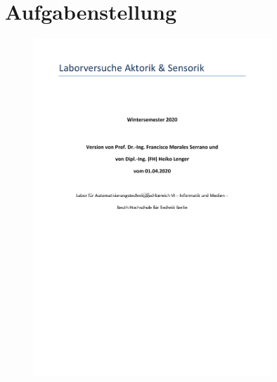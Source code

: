 \section*{Aufgabenstellung}

\begin{figure}[htp]
 \centering
 \includegraphics[page=3, width=0.8\textwidth]{Aufgabenstellung.pdf}
 \label{fig:Aufgabenstellung A1}
\end{figure}

